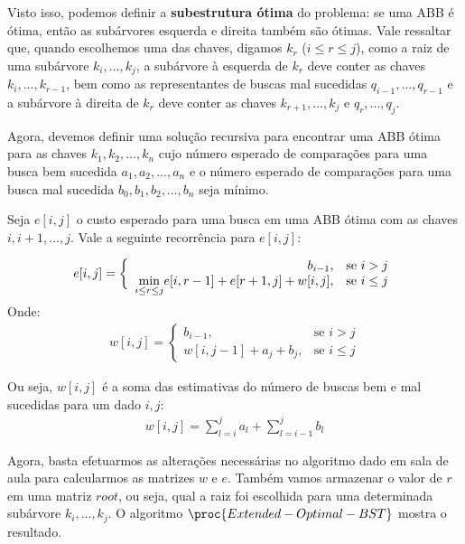 Visto isso, podemos definir a \textbf{subestrutura ótima} do problema: se uma ABB é ótima, então as subárvores esquerda e direita também são ótimas. Vale ressaltar que, quando escolhemos uma das chaves, digamos $k_r$ ($i \leq r \leq j$), como a raiz de uma subárvore $k_i, ...,k_j$, a subárvore à esquerda de $k_r$ deve conter as chaves $k_i, ..., k_{r-1}$, bem como as representantes de buscas mal sucedidas $q_{i-1}, ...,q_{r-1}$ e a subárvore à direita de $k_r$ deve conter as chaves $k_{r+1}, ..., k_{j}$ e $q_r, ..., q_j$.

Agora, devemos definir uma solução recursiva para encontrar uma ABB ótima para as chaves $k_1, k_2, ..., k_n$ cujo número esperado de comparações para uma busca bem sucedida $a_1, a_2, ..., a_n$ e o número esperado de comparações para uma busca mal sucedida $b_0, b_1, b_2, ..., b_n$ seja mínimo.

Seja $e[i, j]$ o custo esperado para uma busca em uma ABB ótima com as chaves $i, i+1, ..., j$. Vale a seguinte recorrência para $e[i, j]$:

\begin{align*}
e[i, j] = \left\{\begin{array}{rl}
                    b_{i - 1}, &\mbox{se $i > j$} \\
                    \smash{\displaystyle\min_{i \leq r \leq j}} {e[i, r-1] + e[r+1, j]} + w[i, j], &\mbox{se $i \leq j $}
                \end{array} \right.
\end{align*}

Onde:
\begin{align*}
w[i, j] = \left\{\begin{array}{rl}
                    b_{i - 1}, &\mbox{se $i > j$} \\
                    w[i, j-1] + a_j + b_j, &\mbox{se $i \leq j $}
                \end{array} \right.
\end{align*}

Ou seja, $w[i, j]$ é a soma das estimativas do número de buscas bem e mal sucedidas para um dado $i, j$:
\begin{align*}
w[i, j] = \sum_{l = i}^j a_l + \sum_{l = i-1}^j b_l
\end{align*}

Agora, basta efetuarmos as alterações necessárias no algoritmo dado em sala de aula para calcularmos as matrizes $w$ e $e$. Também vamos armazenar o valor de $r$ em uma matriz $root$, ou seja, qual a raiz foi escolhida para uma determinada subárvore $k_i, ..., k_j$. O algoritmo $\proc{Extended-Optimal-BST}$ mostra o resultado.

